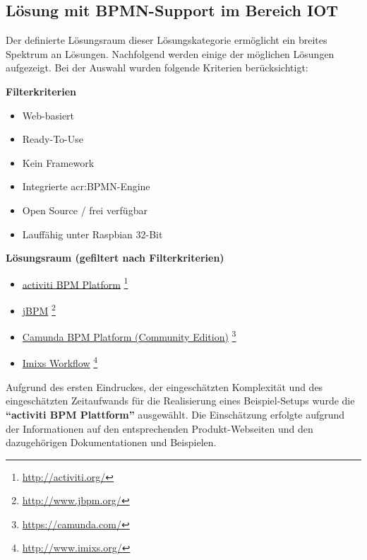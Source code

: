 \subsection{Lösung mit BPMN-Support im Bereich IOT}
Der definierte Lösungsraum dieser Lösungskategorie ermöglicht ein breites Spektrum an Lösungen. Nachfolgend werden einige der möglichen Lösungen aufgezeigt. Bei der Auswahl wurden folgende Kriterien berücksichtigt:

\textbf{Filterkriterien}
\begin{itemize}
\item Web-basiert
\item Ready-To-Use
\item Kein Framework
\item Integrierte \gls{acr:BPMN}-Engine
\item Open Source / frei verfügbar
\item Lauffähig unter Raspbian 32-Bit
\end{itemize}

\textbf{Lösungsraum (gefiltert nach Filterkriterien)}
\begin{itemize}
\item \hyperlink{http://activiti.org/}{activiti BPM Platform} \footnote{\url{http://activiti.org/}}
\item \hyperlink{http://www.jbpm.org/}{jBPM} \footnote{\url{http://www.jbpm.org/}}
\item \hyperlink{https://camunda.com/}{Camunda BPM Platform (Community Edition)} \footnote{\url{https://camunda.com/}}
\item \hyperlink{http://www.imixs.org/}{Imixs Workflow} \footnote{\url{http://www.imixs.org/}}
\end{itemize}

Aufgrund des ersten Eindruckes, der eingeschätzten Komplexität und des eingeschätzten Zeitaufwands für die Realisierung eines Beispiel-Setups wurde die \textbf{"`activiti BPM Plattform"'} ausgewählt. Die Einschätzung erfolgte aufgrund der Informationen auf den entsprechenden Produkt-Webseiten und den dazugehörigen Dokumentationen und Beispielen.
